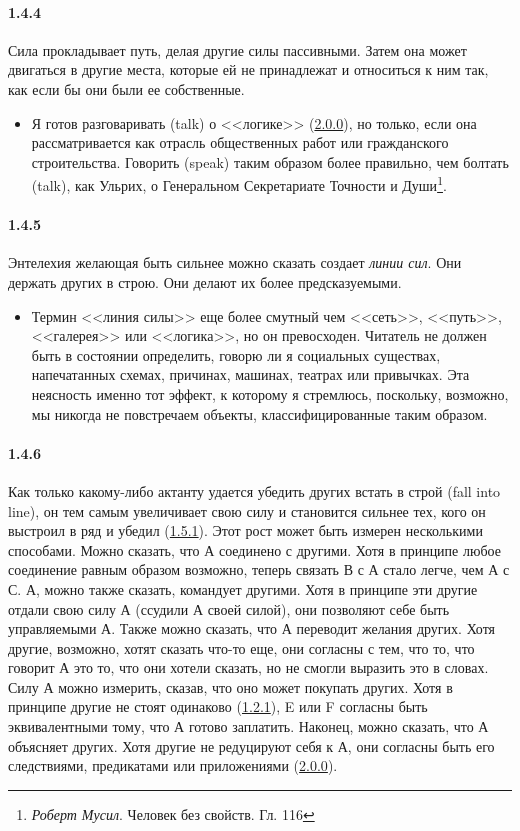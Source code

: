 \paragraph{1.4.4}\hypertarget{par:1.4.4}{} Сила прокладывает путь, делая другие силы пассивными. Затем она может двигаться в другие места, которые ей не принадлежат и относиться к ним так, как если бы они были ее собственные.
	\begin{itemize}
	\item Я готов разговаривать (talk) о <<логике>> (\hyperlink{par:2.0.0}{2.0.0}), но только, если она рассматривается как отрасль общественных работ или гражданского строительства. Говорить (speak) таким образом более правильно, чем болтать (talk), как Ульрих, о Генеральном Секретариате Точности и Души\footnote{{\itshape Роберт Мусил}. Человек без свойств. Гл. 116}.
	\end{itemize}

\paragraph{1.4.5}\hypertarget{par:1.4.5}{} Энтелехия желающая быть сильнее можно сказать создает {\itshape линии сил}. Они держать других в строю. Они делают их более предсказуемыми. 
	\begin{itemize}
	\item Термин <<линия силы>> еще более смутный чем <<сеть>>, <<путь>>, <<галерея>> или <<логика>>, но он превосходен. Читатель не должен быть в состоянии определить, говорю ли я социальных существах, напечатанных схемах, причинах, машинах, театрах или привычках. Эта неясность именно тот эффект, к которому я стремлюсь, поскольку, возможно, мы никогда не повстречаем объекты, классифицированные таким образом.
	\end{itemize}

\paragraph{1.4.6}\hypertarget{par:1.4.6}{} Как только какому-либо актанту удается убедить других встать в строй (fall into line), он тем самым увеличивает свою силу и становится сильнее тех, кого он выстроил в ряд и убедил (\hyperlink{par:1.5.1}{1.5.1}). Этот рост может быть измерен несколькими способами. Можно сказать, что А соединено с другими. Хотя в принципе любое соединение равным образом возможно, теперь связать В с А стало легче, чем А с С. А, можно также сказать, командует другими. Хотя в принципе эти другие отдали свою силу А (ссудили А своей силой), они позволяют себе быть управляемыми А. Также можно сказать, что А переводит желания других. Хотя другие, возможно, хотят сказать что-то еще, они согласны с тем, что то, что говорит А это то, что они хотели сказать, но не смогли выразить это в словах. Силу А можно измерить, сказав, что оно может покупать других. Хотя в принципе другие не стоят одинаково (\hyperlink{par:1.2.1}{1.2.1}), E или F согласны быть эквивалентными тому, что А готово заплатить. Наконец, можно сказать, что А объясняет других. Хотя другие не редуцируют себя к А, они согласны быть его следствиями, предикатами или приложениями (\hyperlink{par:2.0.0}{2.0.0}).

